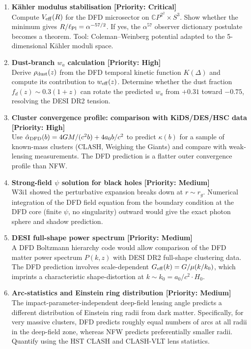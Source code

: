 \documentclass[11pt]{article}
\newcommand{\CP}{\mathbb{C}P^2}
\newcommand{\alphafine}{\alpha}
\newcommand{\mufd}{\mu}
\begin{document}
\begin{enumerate}

\item \textbf{K\"{a}hler modulus stabilisation [Priority: Critical]} \\
Compute $V_{\rm eff}(R)$ for the DFD microsector on $\CP^2\times S^3$.
Show whether the minimum gives $R/\ell_{\rm Pl} = \alphafine^{-57/2}$.
If yes, the $\alpha^{57}$ observer dictionary postulate becomes a theorem.
Tool: Coleman--Weinberg potential adapted to the 5-dimensional
K\"{a}hler moduli space.

\item \textbf{Dust-branch $w_a$ calculation [Priority: High]} \\
Derive $\rho_{\rm dust}(z)$ from the DFD temporal kinetic function
$K(\Delta)$ and compute its contribution to $w_{\rm eff}(z)$.
Determine whether the dust fraction $f_d(z) \sim 0.3(1+z)$
can rotate the predicted $w_a$ from $+0.31$ toward $-0.75$,
resolving the DESI DR2 tension.

\item \textbf{Cluster convergence profile: comparison with KiDS/DES/HSC data [Priority: High]} \\
Use $\hat\alpha_{\rm DFD}(b) = 4GM/(c^2 b) + 4a_0 b/c^2$ to predict
$\kappa(b)$ for a sample of known-mass clusters (CLASH, Weighing the
Giants) and compare with weak-lensing measurements.  The DFD prediction
is a flatter outer convergence profile than NFW.

\item \textbf{Strong-field $\psi$ solution for black holes [Priority: Medium]} \\
W3i1 showed the perturbative expansion breaks down at $r \sim r_g$.
Numerical integration of the DFD field equation from the boundary
condition at the DFD core (finite $\psi$, no singularity) outward
would give the exact photon sphere and shadow prediction.

\item \textbf{DESI full-shape power spectrum [Priority: Medium]} \\
A DFD Boltzmann hierarchy code would allow comparison of the DFD
matter power spectrum $P(k,z)$ with DESI DR2 full-shape clustering
data.  The DFD prediction involves scale-dependent $G_{\rm eff}(k)
= G/\mufd(k/k_0)$, which imprints a characteristic shape-distortion
at $k \sim k_0 = a_0/c^2 \cdot H_0$.

\item \textbf{Arc-statistics and Einstein ring distribution [Priority: Medium]} \\
The impact-parameter-independent deep-field lensing angle predicts
a different distribution of Einstein ring radii from dark matter.
Specifically, for very massive clusters, DFD predicts roughly
equal numbers of arcs at all radii in the deep-field zone, whereas
NFW predicts preferentially smaller radii.  Quantify using the
HST CLASH and CLASH-VLT lens statistics.


\end{enumerate}
\end{document}
